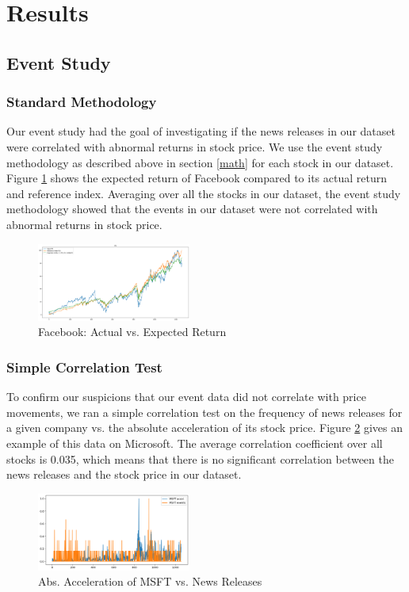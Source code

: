 \documentclass[conference]{IEEEtran}
\begin{document}
\section{Results}
\subsection{Event Study}
\subsubsection{Standard Methodology}
Our event study had the goal of investigating if the news releases in our dataset were correlated with abnormal returns in stock price. We use the event study methodology as described above in section \ref{math} for each stock in our dataset. Figure \ref{fig:expected} shows the expected return of Facebook compared to its actual return and reference index. Averaging over all the stocks in our dataset, the event study methodology showed that the events in our dataset were not correlated with abnormal returns in stock price.
\begin{figure}[ht]
    \centering
    \includegraphics[width=0.45\textwidth]{FBExpectedValues.png}
    \caption{Facebook: Actual vs. Expected Return}
    \label{fig:expected}
\end{figure} 
\subsubsection{Simple Correlation Test}
To confirm our suspicions that our event data did not correlate with price movements, we ran a simple correlation test on the frequency of news releases for a given company vs. the absolute acceleration of its stock price. Figure \ref{fig:acceleartion} gives an example of this data on Microsoft. The average correlation coefficient over all stocks is 0.035, which means that there is no significant correlation between the news releases and the stock price in our dataset.
\begin{figure}[ht]
    \centering
    \includegraphics[width=0.45\textwidth]{MSFTevents.png}
    \caption{Abs. Acceleration of MSFT vs. News Releases}
    \label{fig:acceleartion}
\end{figure}
\end{document}
